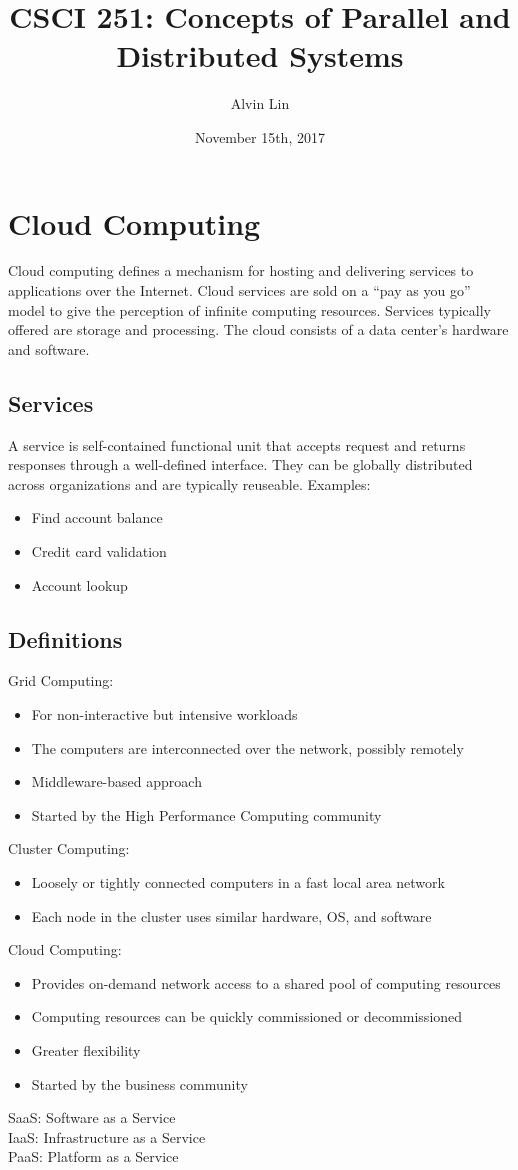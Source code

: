 \documentclass{math}
\title{CSCI 251: Concepts of Parallel and Distributed Systems}
\author{Alvin Lin}
\date{November 15th, 2017}
\begin{document}
\maketitle

\section*{Cloud Computing}
Cloud computing defines a mechanism for hosting and delivering services to
applications over the Internet. Cloud services are sold on a ``pay as you go''
model to give the perception of infinite computing resources. Services
typically offered are storage and processing. The cloud consists of a data
center's hardware and software.

\subsection*{Services}
A service is self-contained functional unit that accepts request and returns
responses through a well-defined interface. They can be globally distributed
across organizations and are typically reuseable. Examples:
\begin{itemize}
  \item Find account balance
  \item Credit card validation
  \item Account lookup
\end{itemize}

\subsection*{Definitions}
Grid Computing:
\begin{itemize}
  \item For non-interactive but intensive workloads
  \item The computers are interconnected over the network, possibly remotely
  \item Middleware-based approach
  \item Started by the High Performance Computing community
\end{itemize}
Cluster Computing:
\begin{itemize}
  \item Loosely or tightly connected computers in a fast local area network
  \item Each node in the cluster uses similar hardware, OS, and software
\end{itemize}
Cloud Computing:
\begin{itemize}
  \item Provides on-demand network access to a shared pool of computing
  resources
  \item Computing resources can be quickly commissioned or decommissioned
  \item Greater flexibility
  \item Started by the business community
\end{itemize}
SaaS: Software as a Service \\
IaaS: Infrastructure as a Service \\
PaaS: Platform as a Service
\end{document}
